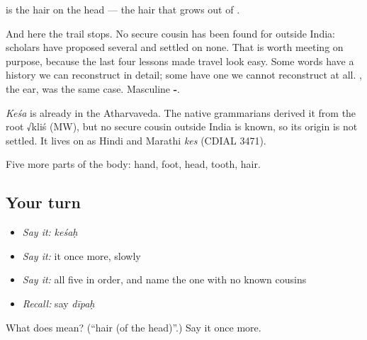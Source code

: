 \textbf{} is the hair on the head — the hair that grows out of .

And here the trail stops. No secure cousin has been found for  outside India: scholars have proposed several and settled on none. That is worth meeting on purpose, because the last four lessons made travel look easy. Some words have a history we can reconstruct in detail; some have one we cannot reconstruct at all. , the ear, was the same case. Masculine \textbf{-}.

\begin{cousinweb}
\emph{Keśa} is already in the Atharvaveda. The native grammarians derived it from the root √kliś (MW), but no secure cousin outside India is known, so its origin is not settled. It lives on as Hindi and Marathi \emph{kes} (CDIAL 3471).
\end{cousinweb}

\begin{grammarlens}[title={What you've built}]
Five more parts of the body: hand, foot, head, tooth, hair.
\end{grammarlens}

\subsection*{Your turn}
\begin{itemize}
\raggedright
  \item \emph{Say it:} \emph{keśaḥ}
  \item \emph{Say it:} it once more, slowly
  \item \emph{Say it:} all five in order, and name the one with no known cousins
  \item \emph{Recall:} say \emph{dīpaḥ}
\end{itemize}

\begin{tcolorbox}[breakable,colback=teal!4,colframe=teal!35!black,title={Before you move on}]
What does  mean? (\textquotedblleft{}hair (of the head)\textquotedblright{}.) Say it once more.
\end{tcolorbox}
